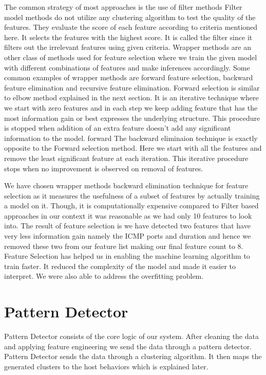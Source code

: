 	The common strategy of most approaches is the use of filter methods Filter model methods do not utilize any clustering algorithm to test the quality of the features. They evaluate the score of each feature according to criteria \cite{dash2002feature} mentioned here. It selects the features with the highest score. It is called the filter since it filters out the irrelevant features using given criteria. 
	Wrapper methods are an other class of methods used for feature selection where we train the given model with different combinations of features and make inferences accordingly.
	Some common examples of wrapper methods are forward feature selection, backward feature elimination and recursive feature elimination. Forward selection is similar to elbow method explained in the next section. It is an iterative technique where we start with zero features and in each step we keep adding feature that has the most information gain or best expresses the underlying structure. This procedure is stopped when addition of an extra feature doesn't add any significant information to the model. forward The backward eliminaion technique is exactly opposite to the Forward selection method. Here we start with all the features and remove the least significant feature at each iteration. This iterative procedure stops when no improvement is observed on removal of features.
	
	We have chosen wrapper methods backward elimination technique for feature selection as it measures the usefulness of a subset of features by actually training a model on it. Though, it is computationally expensive compared to Filter based approaches in our context it was reasonable as we had only 10 features to look into. The result of feature selection is we have detected two features that have very less information gain namely the ICMP ports and duration and hence we removed these two from our feature list making our final feature count to 8.
	 Feature Selection has helped us in enabling the machine learning algorithm to train faster. It reduced the complexity of the model and made it easier to interpret. We were also able to address the overfitting problem.






\section{Pattern Detector}
Pattern Detector consists of the core logic of our system. After cleaning the data and applying feature engineering we send the data through a pattern detector. Pattern Detector sends the data through a clustering algorithm. It then maps the generated clusters to the host behaviors which is explained later.

